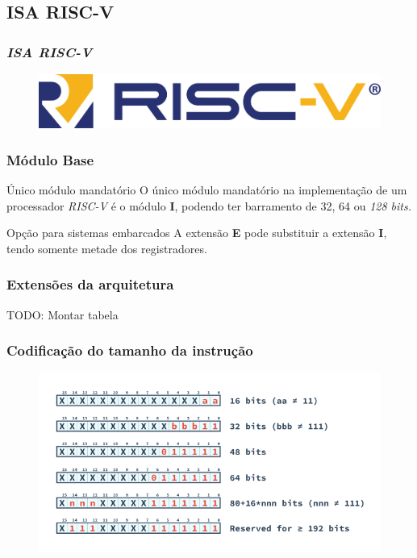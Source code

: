 \documentclass[aspectratio=169]{beamer}
\begin{document}
    \subsection{ISA RISC-V}
    \begin{frame}
        \vfill
        \frametitle{\textit{\textbf{ISA RISC-V}}}
        \begin{figure}[H]
        \centering
            \includegraphics[width=.9\textwidth,height=.9\textheight,keepaspectratio]{../images/riscv_logo.png}
        \end{figure}
        \vfill
    \end{frame}

    \begin{frame}
        \frametitle{Módulo Base}
        \vfill
        \begin{block}{Único módulo mandatório}
            { O único módulo mandatório na implementação de um processador \textit{RISC-V}
                é o módulo \textbf{I}, podendo ter barramento de 32, 64 ou \textit{128 bits.}
            }
        \end{block}
        \vfill
        \begin{exampleblock}{Opção para sistemas embarcados}
            { A extensão \textbf{E} pode substituir a extensão \textbf{I}, tendo somente metade
                dos registradores.
            }
        \end{exampleblock}
        \vfill
    \end{frame}

    \begin{frame}
        \frametitle{Extensões da arquitetura}
        \vfill
        {TODO: Montar tabela}
        \vfill
    \end{frame}

    \begin{frame}
        \frametitle{Codificação do tamanho da instrução}
        \vfill
        \begin{figure}[H]
        \centering
            \includegraphics[width=.9\textwidth,height=.9\textheight,keepaspectratio]{../images/RV_InstructionLength.png}
        \end{figure}
        \vfill
    \end{frame}
\end{document}
